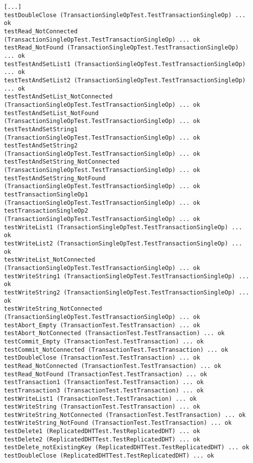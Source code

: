 \begin{lstlisting}[language={}]
%> make python-test
[...]
testDoubleClose (TransactionSingleOpTest.TestTransactionSingleOp) ... ok
testRead_NotConnected (TransactionSingleOpTest.TestTransactionSingleOp) ... ok
testRead_NotFound (TransactionSingleOpTest.TestTransactionSingleOp) ... ok
testTestAndSetList1 (TransactionSingleOpTest.TestTransactionSingleOp) ... ok
testTestAndSetList2 (TransactionSingleOpTest.TestTransactionSingleOp) ... ok
testTestAndSetList_NotConnected (TransactionSingleOpTest.TestTransactionSingleOp) ... ok
testTestAndSetList_NotFound (TransactionSingleOpTest.TestTransactionSingleOp) ... ok
testTestAndSetString1 (TransactionSingleOpTest.TestTransactionSingleOp) ... ok
testTestAndSetString2 (TransactionSingleOpTest.TestTransactionSingleOp) ... ok
testTestAndSetString_NotConnected (TransactionSingleOpTest.TestTransactionSingleOp) ... ok
testTestAndSetString_NotFound (TransactionSingleOpTest.TestTransactionSingleOp) ... ok
testTransactionSingleOp1 (TransactionSingleOpTest.TestTransactionSingleOp) ... ok
testTransactionSingleOp2 (TransactionSingleOpTest.TestTransactionSingleOp) ... ok
testWriteList1 (TransactionSingleOpTest.TestTransactionSingleOp) ... ok
testWriteList2 (TransactionSingleOpTest.TestTransactionSingleOp) ... ok
testWriteList_NotConnected (TransactionSingleOpTest.TestTransactionSingleOp) ... ok
testWriteString1 (TransactionSingleOpTest.TestTransactionSingleOp) ... ok
testWriteString2 (TransactionSingleOpTest.TestTransactionSingleOp) ... ok
testWriteString_NotConnected (TransactionSingleOpTest.TestTransactionSingleOp) ... ok
testAbort_Empty (TransactionTest.TestTransaction) ... ok
testAbort_NotConnected (TransactionTest.TestTransaction) ... ok
testCommit_Empty (TransactionTest.TestTransaction) ... ok
testCommit_NotConnected (TransactionTest.TestTransaction) ... ok
testDoubleClose (TransactionTest.TestTransaction) ... ok
testRead_NotConnected (TransactionTest.TestTransaction) ... ok
testRead_NotFound (TransactionTest.TestTransaction) ... ok
testTransaction1 (TransactionTest.TestTransaction) ... ok
testTransaction3 (TransactionTest.TestTransaction) ... ok
testWriteList1 (TransactionTest.TestTransaction) ... ok
testWriteString (TransactionTest.TestTransaction) ... ok
testWriteString_NotConnected (TransactionTest.TestTransaction) ... ok
testWriteString_NotFound (TransactionTest.TestTransaction) ... ok
testDelete1 (ReplicatedDHTTest.TestReplicatedDHT) ... ok
testDelete2 (ReplicatedDHTTest.TestReplicatedDHT) ... ok
testDelete_notExistingKey (ReplicatedDHTTest.TestReplicatedDHT) ... ok
testDoubleClose (ReplicatedDHTTest.TestReplicatedDHT) ... ok

\end{lstlisting}
